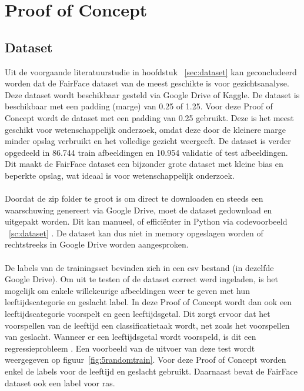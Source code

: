 
\chapter{Proof of Concept}%
\label{ch:proofofconcept}

\section{Dataset} \label{sec:poc-dataset}
Uit de voorgaande literatuurstudie in hoofdstuk ~\ref{sec:dataset} kan geconcludeerd worden dat de FairFace dataset van \textcite{Karkkainen2021} de meest geschikte is voor gezichtsanalyse. Deze dataset wordt beschikbaar gesteld via Google Drive of Kaggle. De dataset is beschikbaar met een padding (marge) van 0.25 of 1.25. Voor deze Proof of Concept wordt de dataset met een padding van 0.25 gebruikt. Deze is het meest geschikt voor wetenschappelijk onderzoek, omdat deze door de kleinere marge minder opslag verbruikt en het volledige gezicht weergeeft. De dataset is verder opgedeeld in 86.744 train afbeeldingen en 10.954 validatie of test afbeeldingen. Dit maakt de FairFace dataset een bijzonder grote dataset met kleine bias en beperkte opslag, wat ideaal is voor wetenschappelijk onderzoek. \\
\\
Doordat de zip folder te groot is om direct te downloaden en steeds een waarschuwing genereert via Google Drive, moet de dataset gedownload en uitgepakt worden. Dit kan manueel, of efficiënter in Python via codevoorbeeld ~\ref{sc:dataset} . De dataset kan dus niet in memory opgeslagen worden of rechtstreeks in Google Drive worden aangesproken.\\
\\
De labels van de trainingsset bevinden zich in een csv bestand (in dezelfde Google Drive). Om uit te testen of de dataset correct werd ingeladen, is het mogelijk om enkele willekeurige afbeeldingen weer te geven met hun leeftijdscategorie en geslacht label. In deze Proof of Concept wordt dan ook een leeftijdscategorie voorspelt en geen leeftijdsgetal. Dit zorgt ervoor dat het voorspellen van de leeftijd een classificatietaak wordt, net zoals het voorspellen van geslacht. Wanneer er een leeftijdsgetal wordt voorspeld, is dit een regressieprobleem \autocite{Geron2019}. Een voorbeeld van de uitvoer van deze test wordt weergegeven op figuur~\ref{fig:5randomtrain}. Voor deze Proof of Concept worden enkel de labels voor de leeftijd en geslacht gebruikt. Daarnaast bevat de FairFace dataset ook een label voor ras.


